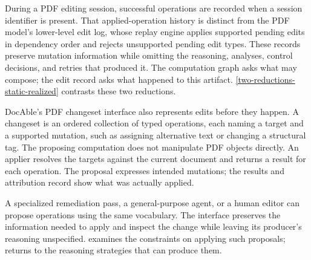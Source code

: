 During a PDF editing session, successful operations are recorded when a session identifier is present. That applied-operation history is distinct from the PDF model's lower-level edit log, whose replay engine applies supported pending edits in dependency order and rejects unsupported pending edit types. These records preserve mutation information while omitting the reasoning, analyses, control decisions, and retries that produced it. The computation graph asks what may compose; the edit record asks what happened to this artifact. \autoref{two-reductions-static-realized} contrasts these two reductions.


DocAble's PDF changeset interface also represents edits before they happen. A changeset is an ordered collection of typed operations, each naming a target and a supported mutation, such as assigning alternative text or changing a structural tag. The proposing computation does not manipulate PDF objects directly. An applier resolves the targets against the current document and returns a result for each operation. The proposal expresses intended mutations; the results and attribution record show what was actually applied.

A specialized remediation pass, a general-purpose agent, or a human editor can propose operations using the same vocabulary. The interface preserves the information needed to apply and inspect the change while leaving its producer's reasoning unspecified.  examines the constraints on applying such proposals;  returns to the reasoning strategies that can produce them.

